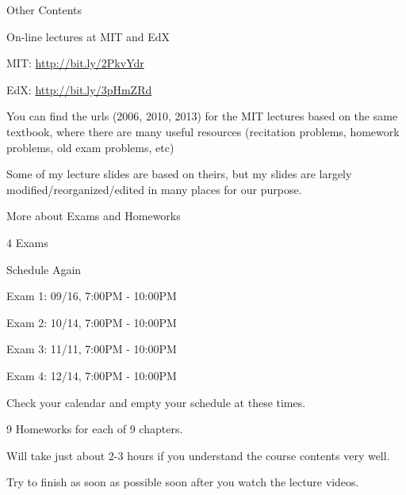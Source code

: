 \begin{frame}{Other Contents}

\bci 

\item On-line lectures at MIT and EdX
\bci
\item MIT: \url{http://bit.ly/2PkvYdr}
\item EdX: \url{http://bit.ly/3pHmZRd}

\item You can find the urls (2006, 2010, 2013) for the MIT lectures
  based on the same textbook, where there are many useful resources
  (recitation problems, homework problems, old exam problems, etc)

\medskip
\item Some of my lecture slides are based on theirs, but my slides
   are largely  modified/reorganized/edited in many places for our
   purpose. 
\eci

\eci

\end{frame}





\begin{frame}{More about Exams and Homeworks}

\bci 

\item 4 Exams

\item Schedule Again

\bci
\item Exam 1: 09/16, 7:00PM - 10:00PM
\item Exam 2: 10/14, 7:00PM - 10:00PM
\item Exam 3: 11/11, 7:00PM - 10:00PM
\item Exam 4: 12/14, 7:00PM - 10:00PM
\item Check your calendar and empty your schedule at these times. 
  \eci

\item 9 Homeworks for each of 9 chapters. 
  \bci
  \item Will take just about 2-3 hours if you understand the course
    contents very well.

    \item Try to finish as soon as possible soon after you watch the lecture videos. 
  \eci

  \eci

\end{frame}

